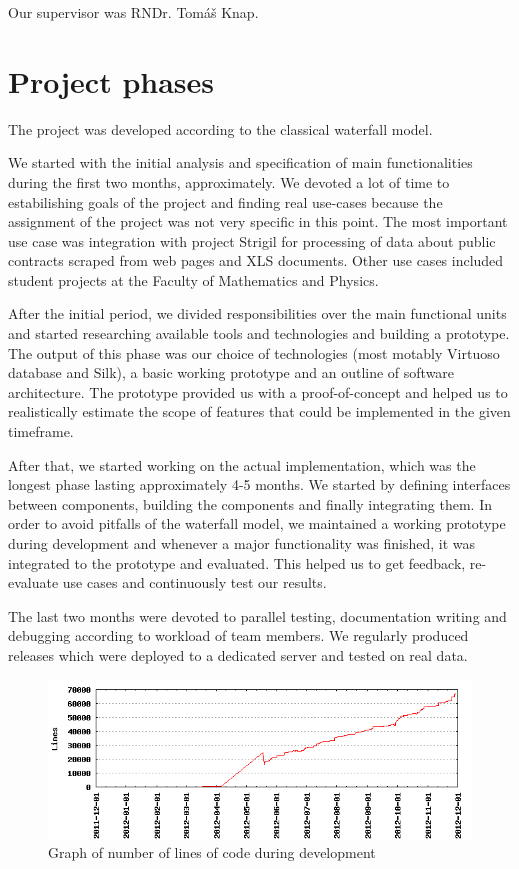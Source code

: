 Our supervisor was RNDr. Tom\'a\v s Knap.

\section*{Project phases}
The project was developed according to the classical waterfall model. 

We started with the initial analysis and specification of main functionalities  during the first two months, approximately. We devoted a lot of time to estabilishing goals of the project and finding real use-cases because the assignment of the project was not very specific in this point. The most important use case was integration with project Strigil for processing of data about public contracts scraped from web pages and XLS documents. Other use cases included student projects at the Faculty of Mathematics and Physics. 

After the initial period, we divided responsibilities over the main functional units and started researching available tools and technologies and building a prototype. The output of this phase was our choice of technologies (most motably Virtuoso database and Silk), a basic working prototype and an outline of software architecture. The prototype provided us with a proof-of-concept and helped us to realistically estimate the scope of features that could  be implemented in the given timeframe. 

After that, we started working on the actual implementation, which was the longest phase lasting approximately 4-5 months. We started by defining interfaces between components, building the components and finally integrating them. In order to avoid pitfalls of the waterfall model, we maintained a working prototype during development and whenever a major functionality was finished, it was integrated to the prototype and evaluated. This helped us to get feedback, re-evaluate use cases and continuously test our results.

The last two months were devoted to parallel testing, documentation writing and debugging according to workload of team members. We regularly produced releases which were deployed to a dedicated server and tested on real data.

\begin{figure}[htb]
    \centering
    \includegraphics[width=\textwidth]{images/lines-of-code.png}
    \caption{Graph of number of lines of code during development}
	\label{fig:linesOfCode}
\end{figure}

